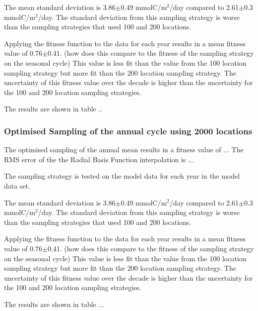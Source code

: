 \documentclass[11pt, a4paper]{article}
\numberwithin{figure}{section}
\numberwithin{table}{section}
\begin{document}
The mean standard deviation is 3.86$\pm$0.49 mmolC/m$^2$/day
compared to 2.61$\pm$0.3 mmolC/m$^2$/day. The standard deviation from 
this sampling strategy is worse than the sampling strategies 
that used 100 and 200 locations. 

Applying the fitness function to the data for each year results in a
mean fitness value of 0.76$\pm$0.41. 
(how does this compare to the fitness of the sampling strategy on the
seasonal cycle)
This value is less fit than the value from the 100 location sampling
strategy but more fit than the 200 location sampling strategy.
The uncertainty of this fitness value over the decade is higher than
the uncertainty for the 100 and 200 location sampling strategies.

The results are shown in table ..



\subsubsection{Optimised Sampling of the annual cycle using 2000 locations}
The optimised sampling of the annual mean results in a fitness value
of ...
The RMS error of the the Radial Basis Function interpolation is ...

The sampling strategy is tested on the model data for each year in the
model data set.

The mean standard deviation is 3.86$\pm$0.49 mmolC/m$^2$/day
compared to 2.61$\pm$0.3 mmolC/m$^2$/day. The standard deviation from 
this sampling strategy is worse than the sampling strategies 
that used 100 and 200 locations. 

Applying the fitness function to the data for each year results in a
mean fitness value of 0.76$\pm$0.41. 
(how does this compare to the fitness of the sampling strategy on the
seasonal cycle)
This value is less fit than the value from the 100 location sampling
strategy but more fit than the 200 location sampling strategy.
The uncertainty of this fitness value over the decade is higher than
the uncertainty for the 100 and 200 location sampling strategies.

The results are shown in table ...


\end{document}
